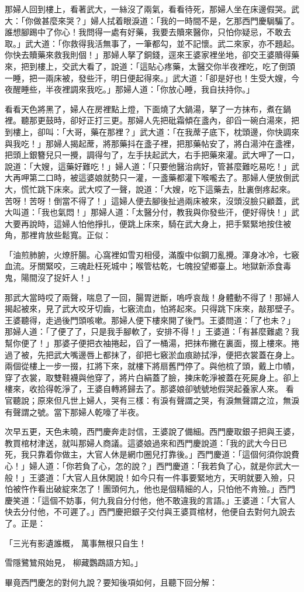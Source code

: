 那婦人回到樓上，看著武大，一絲沒了兩氣，看看待死，那婦人坐在床邊假哭。武大：「你做甚麼來哭？」婦人拭着眼淚道：「我的一時間不是，乞那西門慶駶騙了。誰想腳踢中了你心！我問得一處有好藥，我要去贖來醫你，只怕你疑忌，不敢去取。」武大道：「你救得我活無事了，一筆都勾，並不記懷。武二來家，亦不題起。你快去贖藥來救我則個！」那婦人拏了銅錢，逕來王婆家裡坐地，卻交王婆贖得藥來，把到樓上，交武大看了，說道：「這貼心疼藥，太醫交你半夜裡吃，吃了倒頭一睡，把一兩床被，發些汗，明日便起得來。」武大道：「卻是好也！生受大嫂，今夜醒睡些，半夜裡調來我吃。」那婦人道：「你放心睡，我自扶持你。」

看看天色將黑了，婦人在房裡點上燈，下面燒了大鍋湯，拏了一方抹布，煮在鍋裡。聽那更鼓時，卻好正打三更。那婦人先把砒霜傾在盞內，卻舀一碗白湯來，把到樓上，卻叫：「大哥，藥在那裡？」武大道：「在我蓆子底下，枕頭邊，你快調來與我吃！」那婦人揭起蓆，將那藥抖在盞子裡，把那藥帖安了，將白湯沖在盞裡，把頭上銀簪兒只一攪，調得勻了，左手扶起武大，右手把藥來灌。武大呷了一口，說道：「大嫂，這藥好難吃！」婦人道：「只要他醫治病好，管甚麼難吃易吃！」武大再呷第二口時，被這婆娘就勢只一灌，一盞藥都灌下喉嚨去了。那婦人便放倒武大，慌忙跳下床來。武大哎了一聲，說道：「大嫂，吃下這藥去，肚裏倒疼起來。苦呀！苦呀！倒當不得了！」這婦人便去腳後扯過兩床被來，沒頭沒臉只顧蓋，武大叫道：「我也氣悶！」那婦人道：「太醫分付，教我與你發些汗，便好得快！」武大要再說時，這婦人怕他掙扎，便跳上床來，騎在武大身上，把手緊緊地按住被角，那裡肯放些鬆寬。正似：

「油煎肺腑，火燎肝腸。心窩裡如雪刃相侵，滿腹中似鋼刀亂攪。渾身冰冷，七竅血流。牙關緊咬，三魂赴枉死城中；喉管枯乾，七魄投望鄉臺上。地獄新添食毒鬼，陽間沒了捉奸人！」

那武大當時哎了兩聲，喘息了一回，腸胃迸斷，嗚呼哀哉！身體動不得了！那婦人揭起被來，見了武大咬牙切齒，七竅流血，怕將起來。只得跳下床來，敲那壁子。王婆聽得，走過後門頭咳嗽。那婦人便下樓來開了後門。王婆問道：「了也未？」那婦人道：「了便了了，只是我手腳軟了，安排不得！」王婆道：「有甚麼難處？我幫你便了！」那婆子便把衣袖捲起，舀了一桶湯，把抹布撇在裏面，掇上樓來。捲過了被，先把武大嘴邊唇上都抹了，卻把七竅淤血痕跡拭淨，便把衣裳蓋在身上。兩個從樓上一步一掇，扛將下來，就樓下將扇舊門停了。與他梳了頭，戴上巾幘，穿了衣裳，取雙鞋襪與他穿了，將片白絹蓋了臉，揀床乾淨被蓋在死屍身上。卻上樓來，收拾得乾淨了，王婆自轉將歸去了。那婆娘卻號號地假哭起養家人來。
看官聽說；原來但凡世上婦人，哭有三樣：有淚有聲謂之哭，有淚無聲謂之泣，無淚有聲謂之號。當下那婦人乾嚎了半夜。

次早五更，天色未曉，西門慶奔走討信，王婆說了備細。西門慶取銀子把與王婆，教買棺材津送，就叫那婦人商議。這婆娘過來和西門慶說道：「我的武大今日已死，我只靠着你做主，大官人休是網巾圈兒打靠後。」西門慶道：「這個何須你說費心！」婦人道：「你若負了心，怎的說？」西門慶道：「我若負了心，就是你武大一般！」王婆道：「大官人且休閑說！如今只有一件事要緊地方，天明就要入殮，只怕被忤作看出破綻來怎了！團頭何九，他也是個精細的人，只怕他不肯殮。」西門慶笑道：「這個不妨事，何九我自分付他，他不敢違我的言語。」王婆道：「大官人快去分付他，不可遲了。」西門慶把銀子交付與王婆買棺材，他便自去對何九說去了。正是：

「三光有影遺誰概，  萬事無根只自生！

雪隱鷺鷥飛始見，  柳藏鸚鵡語方知。」

畢竟西門慶怎的對何九說？要知後項如何，且聽下回分解：